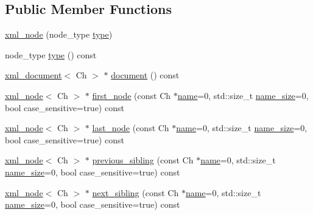\subsection*{Public Member Functions}
\begin{DoxyCompactItemize}
\item 
\hyperlink{classrapidxml_1_1xml__node_a8bd9019960b90605a45998b661fb1b0e}{xml\-\_\-node} (node\-\_\-type \hyperlink{classrapidxml_1_1xml__node_a2c6a4315b98bcfa2e04fed3fa1b22c36}{type})
\item 
node\-\_\-type \hyperlink{classrapidxml_1_1xml__node_a2c6a4315b98bcfa2e04fed3fa1b22c36}{type} () const 
\item 
\hyperlink{classrapidxml_1_1xml__document}{xml\-\_\-document}$<$ Ch $>$ $\ast$ \hyperlink{classrapidxml_1_1xml__node_adb6ad21a4590cf13d4a6a5036e3cdbbc}{document} () const 
\item 
\hyperlink{classrapidxml_1_1xml__node}{xml\-\_\-node}$<$ Ch $>$ $\ast$ \hyperlink{classrapidxml_1_1xml__node_a2dedeb4e04bb35e06a9a7bddf6ba652d}{first\-\_\-node} (const Ch $\ast$\hyperlink{classrapidxml_1_1xml__base_a9a09739310469995db078ebd0da3ed45}{name}=0, std\-::size\-\_\-t \hyperlink{classrapidxml_1_1xml__base_a7e7f98b3d01e1eab8dc1ca69aad9af84}{name\-\_\-size}=0, bool case\-\_\-sensitive=true) const 
\item 
\hyperlink{classrapidxml_1_1xml__node}{xml\-\_\-node}$<$ Ch $>$ $\ast$ \hyperlink{classrapidxml_1_1xml__node_a2ace550c18cf10da6303773972d7157f}{last\-\_\-node} (const Ch $\ast$\hyperlink{classrapidxml_1_1xml__base_a9a09739310469995db078ebd0da3ed45}{name}=0, std\-::size\-\_\-t \hyperlink{classrapidxml_1_1xml__base_a7e7f98b3d01e1eab8dc1ca69aad9af84}{name\-\_\-size}=0, bool case\-\_\-sensitive=true) const 
\item 
\hyperlink{classrapidxml_1_1xml__node}{xml\-\_\-node}$<$ Ch $>$ $\ast$ \hyperlink{classrapidxml_1_1xml__node_a001ece4e227eebbd6ad0ec7dacf1c00b}{previous\-\_\-sibling} (const Ch $\ast$\hyperlink{classrapidxml_1_1xml__base_a9a09739310469995db078ebd0da3ed45}{name}=0, std\-::size\-\_\-t \hyperlink{classrapidxml_1_1xml__base_a7e7f98b3d01e1eab8dc1ca69aad9af84}{name\-\_\-size}=0, bool case\-\_\-sensitive=true) const 
\item 
\hyperlink{classrapidxml_1_1xml__node}{xml\-\_\-node}$<$ Ch $>$ $\ast$ \hyperlink{classrapidxml_1_1xml__node_ac59af4dd5f0ec715753e42467dff6aed}{next\-\_\-sibling} (const Ch $\ast$\hyperlink{classrapidxml_1_1xml__base_a9a09739310469995db078ebd0da3ed45}{name}=0, std\-::size\-\_\-t \hyperlink{classrapidxml_1_1xml__base_a7e7f98b3d01e1eab8dc1ca69aad9af84}{name\-\_\-size}=0, bool case\-\_\-sensitive=true) const 

\end{DoxyCompactItemize}
